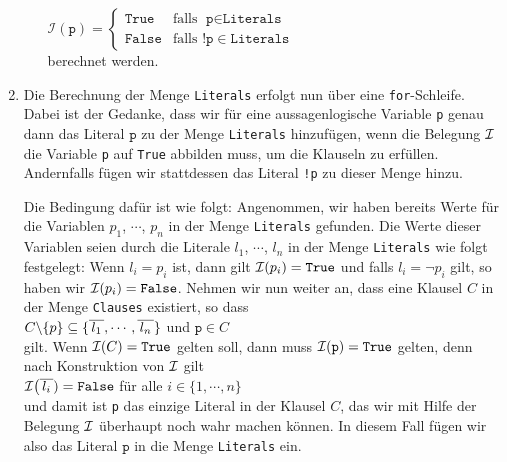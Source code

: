 \begin{enumerate}
\begin{enumerate}
            \hspace*{1.3cm}
            $\mathcal{I}(\texttt{p}) = \left\{
             \begin{array}{ll}
               \texttt{True}  & \mbox{falls $\;\texttt{p} \in \texttt{Literals}$} \\
               \texttt{False} & \mbox{falls $!\texttt{p} \in \texttt{Literals}$}
             \end{array}\right.
            $
            \\[0.2cm]
            berechnet werden.
      \end{enumerate}
\item Die Berechnung der Menge \texttt{Literals} erfolgt nun über eine \texttt{for}-Schleife.
      Dabei ist der Gedanke, dass wir für eine aussagenlogische Variable \texttt{p} genau dann das Literal
      $\texttt{p}$ zu der Menge \texttt{Literals} hinzufügen, wenn die Belegung $\mathcal{I}$ die Variable \texttt{p}
      auf \texttt{True} abbilden muss, um die Klauseln zu erfüllen.  Andernfalls fügen wir stattdessen das Literal 
     \texttt{!p} zu dieser Menge hinzu.

      Die Bedingung dafür ist wie folgt: Angenommen, wir haben bereits Werte für die Variablen
      $p_1$, $\cdots$, $p_n$ in der Menge \texttt{Literals}  gefunden.
      Die Werte dieser Variablen seien durch die Literale $l_1$, $\cdots$, $l_n$ in der Menge \texttt{Literals}
      wie folgt festgelegt: Wenn $l_i = p_i$ ist, dann gilt $\mathcal{I}(p_i) = \texttt{True}$ 
      und falls $l_i = \neg p_i$ gilt, so haben wir $\mathcal{I}(p_i) = \texttt{False}$.
      Nehmen wir nun weiter an, dass eine Klausel $C$ in der Menge \texttt{Clauses} existiert, so dass
      \\[0.2cm]
      \hspace*{1.3cm}
      $C \backslash \{p\} \subseteq \{ \overline{\,l_1\,}, \cdots, \overline{\,l_n\,} \}$ \quad und \quad $\texttt{p} \in C$
      \\[0.2cm]
      gilt.  Wenn $\mathcal{I}(C) = \texttt{True}$ gelten soll, dann muss $\mathcal{I}(\texttt{p}) = \texttt{True}$ gelten, denn
      nach Konstruktion von $\mathcal{I}$ gilt 
      \\[0.2cm]
      \hspace*{1.3cm}
      $\mathcal{I}\bigl(\overline{\,l_i\,}) = \texttt{False}$ \quad für alle $i \in \{1,\cdots,n\}$
      \\[0.2cm]
      und damit ist \texttt{p} das einzige Literal in der Klausel $C$, das wir mit Hilfe der Belegung $\mathcal{I}$
      überhaupt noch wahr machen können.  In diesem Fall fügen wir also das Literal
      $\texttt{p}$ in die Menge \texttt{Literals} ein. 
\end{enumerate}
